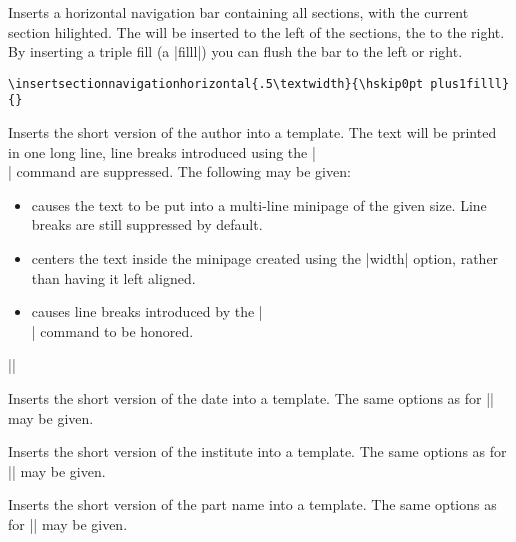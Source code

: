 \begin{command}{\insertsectionnavigationhorizontal{}%
    }
  Inserts a horizontal navigation bar containing all sections, with
  the current section hilighted. The  will be
  inserted to the left of the sections, the  to the
  right. By inserting a triple fill (a
  |filll|) you can flush the bar to the left or right.
  \example
\begin{verbatim}
\insertsectionnavigationhorizontal{.5\textwidth}{\hskip0pt plus1filll}{}
\end{verbatim}
\end{command}

\begin{command}{\insertshortauthor{}}
  Inserts the short version of the author into a template. The text
  will be printed in one long line, line breaks introduced using the
  |\\| command are suppressed.  The
  following  may be given:
  \begin{itemize}
  \item
    causes the text to be put into a multi-line minipage of the given
    size. Line breaks are still suppressed by default.
  \item
    centers the text inside the minipage created using the |width|
    option, rather than having it left aligned.
  \item
    causes line breaks introduced by the |\\| command to be honored.    
  \end{itemize}

  \example |\insertauthor[width={3cm},center,respectlinebreaks]|
\end{command}

\begin{command}{\insertshortdate{}}
  Inserts the short version of the date into a template. The same
  options as for |\insertshortauthor| may be given. 
\end{command}

\begin{command}{\insertshortinstitute{}}
  Inserts the short version of the institute into a template. The same
  options as for |\insertshortauthor| may be given. 
\end{command}

\begin{command}{\insertshortpart{}}
  Inserts the short version of the part name into a template. The same
  options as for |\insertshortauthor| may be given. 
\end{command}

